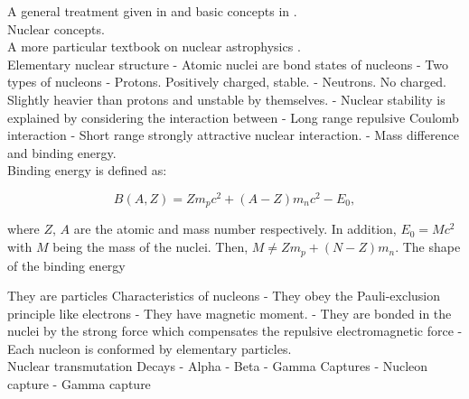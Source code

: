 \documentclass[openany]{book}
\begin{document}
A general treatment given in \cite{basdevant_rich_spiro_2004} and basic concepts in \cite{heyde_2020}. \\

\indent Nuclear concepts. \\

A more particular textbook on nuclear astrophysics \cite{iliadis_2015}. \\


Elementary nuclear structure 
-	Atomic nuclei are bond states of nucleons 
-	Two types of nucleons
	-	Protons. Positively charged, stable.
	-	Neutrons. No charged. Slightly heavier than protons and unstable by themselves. 
-	Nuclear stability is explained by considering the interaction between 
	-	Long range repulsive Coulomb interaction 
	-   Short range strongly attractive nuclear interaction. 
	-	Mass difference and binding energy.
\\

Binding energy is defined as:

\begin{equation} \label{eq:restEnergy}
	 B(A, Z) = Zm_pc^2 + (A-Z)m_nc^2 - E_0,
\end{equation}

where $Z$, $A$ are the atomic and mass number respectively.  In addition, $E_0 = Mc^2$ with $M$ being the mass of the nuclei. Then, $M \neq Zm_p + (N - Z)m_n$. The shape of the binding energy \\


They are particles
Characteristics of nucleons
-	They obey the Pauli-exclusion principle like electrons
- 	They have magnetic moment.
-	They are bonded in the nuclei by the strong force which compensates the repulsive electromagnetic force
-	Each nucleon is conformed by elementary particles. \\

Nuclear transmutation 
Decays
-	Alpha 
-	Beta
-	Gamma 
Captures 
-	Nucleon capture
-	Gamma capture \\ 
\end{document}
